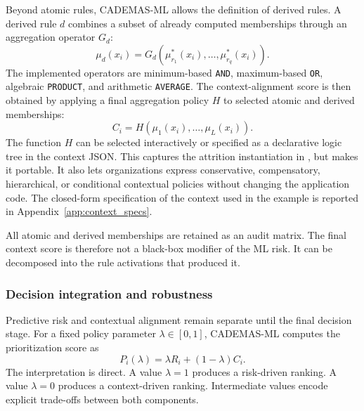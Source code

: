 \documentclass{interact}
\begin{document}
Beyond atomic rules, CADEMAS-ML allows the definition of derived rules. A derived rule $d$ combines a subset of already computed memberships through an aggregation operator $G_d$:
\begin{equation}
\mu_d(x_i)=G_d\left(\mu_{r_1}^{*}(x_i),\ldots,\mu_{r_q}^{*}(x_i)\right).
\label{eq:derived_mu}
\end{equation}
The implemented operators are minimum-based \texttt{AND}, maximum-based \texttt{OR}, algebraic \texttt{PRODUCT}, and arithmetic \texttt{AVERAGE}. The context-alignment score is then obtained by applying a final aggregation policy $H$ to selected atomic and derived memberships:
\begin{equation}
C_i = H\left(\mu_1(x_i),\ldots,\mu_L(x_i)\right).
\label{eq:context_score}
\end{equation}
The function $H$ can be selected interactively or specified as a declarative logic tree in the context JSON. This captures the attrition instantiation in \citet{Godz2026}, but makes it portable. It also lets organizations express conservative, compensatory, hierarchical, or conditional contextual policies without changing the application code. The closed-form specification of the context used in the example is reported in Appendix~\ref{app:context_specs}.

All atomic and derived memberships are retained as an audit matrix. The final context score is therefore not a black-box modifier of the ML risk. It can be decomposed into the rule activations that produced it.

\subsubsection{Decision integration and robustness}

Predictive risk and contextual alignment remain separate until the final decision stage. For a fixed policy parameter $\lambda\in[0,1]$, CADEMAS-ML computes the prioritization score as
\begin{equation}
P_i(\lambda)=\lambda R_i+(1-\lambda)C_i.
\label{eq:priority_lambda}
\end{equation}
The interpretation is direct. A value $\lambda=1$ produces a risk-driven ranking. A value $\lambda=0$ produces a context-driven ranking. Intermediate values encode explicit trade-offs between both components.
\end{document}
